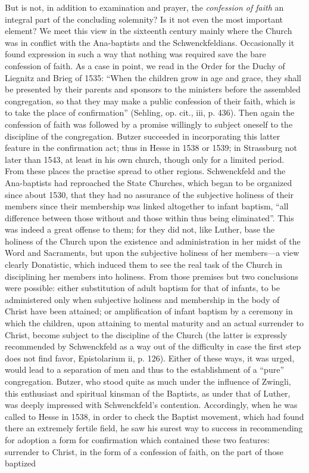 But is not, in addition to examination and prayer, the \emph{confession of faith} an integral part of the concluding solemnity? Is it not even the most important element? We meet this view in the sixteenth century mainly where the Church was in conflict with the Ana-baptists and the Schwenckfeldians. Occasionally it found expression in such a way that nothing was required save the bare confession of faith. As a case in point, we read in the Order for the Duchy of Liegnitz and Brieg of 1535: “When the children grow in age and grace, they shall be presented by their parents and sponsors to the ministers before the assembled congregation, so that they may make a public confession of their faith, which is to take the place of confirmation” (Sehling, op. cit., iii, p. 436). Then again the confession of faith was followed by a promise willingly to subject oneself to the discipline of the congregation. Butzer succeeded in incorporating this latter feature in the confirmation act; thus in Hesse in 1538 or 1539; in Strassburg not later than 1543, at least in his own church, though only
for a limited period. From these places the practise spread to other regions. Schwenckfeld and the Ana-baptists had reproached the State Churches, which began to be organized since about 1530, that they had no assurance of the subjective holiness of their members since their membership was linked altogether to infant baptism, “all difference between those without and those within thus being eliminated”. This was indeed a great offense to them; for they did not, like Luther, base the holiness of the Church upon the existence and administration in her midst of the Word and Sacraments, but upon the subjective holiness of her members—a view clearly Donatistic, which induced them to see the real task of the Church in disciplining her members into holiness. From those premises but two conclusions were possible: either substitution of adult baptism for that of infants, to be administered only when subjective holiness and membership in the body of Christ have been attained; or amplification of infant baptism by a ceremony in which the children, upon attaining to mental maturity and an actual surrender to Christ, become subject to the discipline of the Church (the latter is expressly recommended by Schwenckfeld as a way out of the difficulty in case the first step does not find favor, Epistolarium ii, p. 126). Either of these ways, it was urged, would lead to a separation of men and thus to the establishment of a “pure” congregation. Butzer, who stood quite as much under the influence of Zwingli, this enthusiast and spiritual kinsman of the Baptists, as under that of Luther, was deeply impressed with Schwenckfeld’s contention. Accordingly, when he was called to Hesse in 1538, in order to check the Baptist movement, which had found there an extremely fertile field, he saw his surest way to success in recommending for adoption a form for confirmation which contained these two features: surrender to Christ, in the form of a confession of faith, on the part of those baptized
